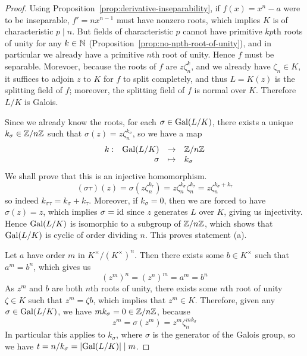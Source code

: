 \begin{proof}
    Using Proposition~\ref{prop:derivative-inseparability},
    if \(f(x) = x^n - a\) were to be inseparable, \(f' = nx^{n-1}\) must have nonzero roots,
    which implies \(K\) is of characteristic \(p \mid n\).
    But fields of characteristic \(p\) cannot have primitive \(kp\)th roots of unity for any \(k \in \mathbb{N}\)
    (Proposition~\ref{prop:no-npth-root-of-unity}),
    and in particular we already have a primitive \(n\)th root of unity.
    Hence \(f\) must be separable.
    Morevoer, because the roots of \(f\) are \(z\zeta_n^k\),
    and we already have \(\zeta_n \in K\),
    it suffices to adjoin \(z\) to \(K\) for \(f\) to split completely,
    and thus \(L = K(z)\) is the splitting field of \(f\);
    moreover, the splitting field of \(f\) is normal over \(K\).
    Therefore \(L/K\) is Galois.

    Since we already know the roots,
    for each \(\sigma \in \operatorname{Gal}(L/K)\), there exists a unique \(k_\sigma \in \mathbb{Z}/n\mathbb{Z}\)
    such that \(\sigma(z) = z\zeta_n^{k_\sigma}\), so we have a map
    \begin{equation*}
        \begin{array}{rrcl} {k}: & {\operatorname{Gal}(L/K)} &\to & {\mathbb{Z}/n\mathbb{Z}} \\ & {\sigma} &\mapsto & {k_\sigma} \end{array}
    \end{equation*}
    We shall prove that this is an injective homomorphism.
    \begin{equation*}
        (\sigma\tau)(z) = \sigma(z\zeta_n^{k_\tau}) = z\zeta_n^{k_\sigma}\zeta_n^{k_\tau}
        = z\zeta_n^{k_\sigma+k_\tau}
    \end{equation*}
    so indeed \(k_{\sigma\tau} = k_\sigma+k_\tau\).
    Moreover, if \(k_\sigma = 0\), then we are forced to have \(\sigma(z) = z\),
    which implies \(\sigma = \operatorname{id}\) since \(z\) generates \(L\) over \(K\), giving us injectivity.
    Hence \(\operatorname{Gal}(L/K)\) is isomorphic to a subgroup of \(\mathbb{Z}/n\mathbb{Z}\),
    which shows that \(\operatorname{Gal}(L/K)\) is cyclic of order dividing \(n\).
    This proves statement (a).

    \medskip

    Let \(a\) have order \(m\) in \(K^\times/{(K^\times)}^n\).
    Then there exists some \(b \in K^\times\) such that \(a^m = b^n\),
    which gives us
    \[{(z^m)}^n = {(z^n)}^m = a^m = b^n\]
    As \(z^m\) and \(b\) are both \(n\)th roots of unity,
    there exists some \(n\)th root of unity \(\zeta \in K\) such that \(z^m = \zeta b\),
    which implies that \(z^m \in K\).
    Therefore, given any \(\sigma \in \operatorname{Gal}(L/K)\),
    we have \(mk_\sigma = 0 \in \mathbb{Z}/n\mathbb{Z}\), because
    \[z^m = \sigma(z^m) = z^m\zeta_n^{mk_\sigma}\]
    In particular this applies to \(k_\sigma\), where \(\sigma\) is the generator of the Galois group,
    so we have \(t = n/k_{\sigma} = \abs{\operatorname{Gal}(L/K)} \mid m\).


\end{proof}
